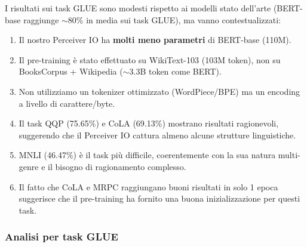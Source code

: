 \documentclass[12pt,a4paper]{article}
\begin{document}
\begin{center}
\end{center}

\begin{notabox}
I risultati sui task GLUE sono modesti rispetto ai modelli stato dell'arte (BERT-base raggiunge $\sim$80\% in media sui task GLUE), ma vanno contestualizzati:
\begin{enumerate}[label=(\roman*)]
    \item Il nostro Perceiver IO ha \textbf{molti meno parametri} di BERT-base (110M).
    \item Il pre-training \`e stato effettuato su WikiText-103 (103M token), non su BooksCorpus + Wikipedia ($\sim$3.3B token come BERT).
    \item Non utilizziamo un tokenizer ottimizzato (WordPiece/BPE) ma un encoding a livello di carattere/byte.
    \item Il task QQP (75.65\%) e CoLA (69.13\%) mostrano risultati ragionevoli, suggerendo che il Perceiver IO cattura almeno alcune strutture linguistiche.
    \item MNLI (46.47\%) \`e il task pi\`u difficile, coerentemente con la sua natura multi-genre e il bisogno di ragionamento complesso.
    \item Il fatto che CoLA e MRPC raggiungano buoni risultati in solo 1 epoca suggerisce che il pre-training ha fornito una buona inizializzazione per questi task.
\end{enumerate}
\end{notabox}

\subsubsection{Analisi per task GLUE}
\end{document}
